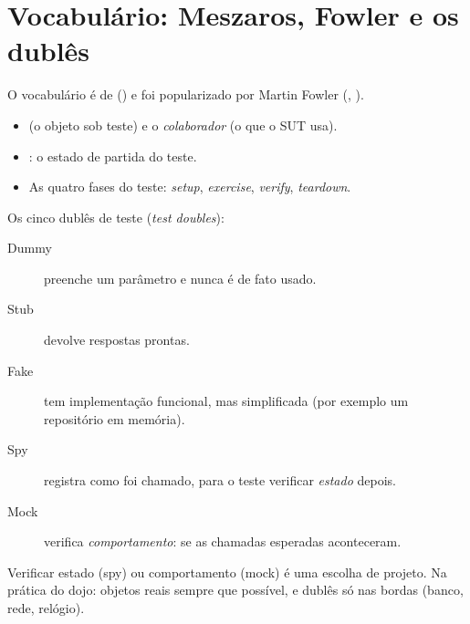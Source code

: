 \section{Vocabulário: Meszaros, Fowler e os dublês}

O vocabulário é de \citeauthor{livro:meszaros2007}
() e foi popularizado por Martin Fowler
(, ).

\begin{itemize}
\item {} (o objeto sob teste) e o \emph{colaborador} (o que o
  SUT usa).
\item {}: o estado de partida do
  teste.
\item As quatro fases do teste: \emph{setup}, \emph{exercise},
  \emph{verify}, \emph{teardown}.
\end{itemize}

Os cinco dublês de teste (\emph{test doubles}):

\begin{description}
\item[Dummy] preenche um parâmetro e nunca é de fato usado.
\item[Stub] devolve respostas prontas.
\item[Fake] tem implementação funcional, mas simplificada (por exemplo um
  repositório em memória).
\item[Spy] registra como foi chamado, para o teste verificar
  \emph{estado} depois.
\item[Mock] verifica
  \emph{comportamento}: se as chamadas esperadas aconteceram.
\end{description}

Verificar estado (spy) ou comportamento (mock) é uma escolha de projeto.
Na prática do dojo: objetos reais sempre que possível, e dublês só nas
bordas (banco, rede, relógio).

